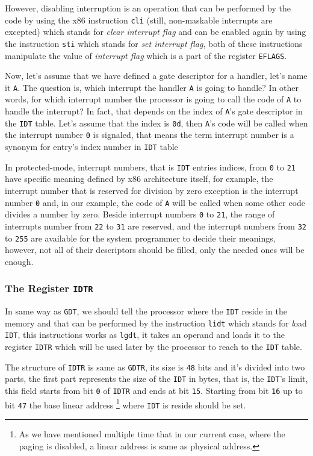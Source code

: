 However, disabling interruption is an operation that can be performed by
the code by using the x86 instruction \lstinline!cli! (still,
non-maskable interrupts are excepted) which stands for \emph{clear
interrupt flag} and can be enabled again by using the instruction
\lstinline!sti! which stands for \emph{set interrupt flag}, both of
these instructions manipulate the value of \emph{interrupt flag} which
is a part of the register \lstinline!EFLAGS!.

Now, let's assume that we have defined a gate descriptor for a handler,
let's name it \lstinline!A!. The question is, which interrupt the
handler \lstinline!A! is going to handle? In other words, for which
interrupt number the processor is going to call the code of
\lstinline!A! to handle the interrupt? In fact, that depends on the
index of \lstinline!A!'s gate descriptor in the \lstinline!IDT! table.
Let's assume that the index is \lstinline!0d!, then \lstinline!A!'s code
will be called when the interrupt number \lstinline!0! is signaled, that
means the term interrupt number is a synonym for entry's index number in
\lstinline!IDT! table

In protected-mode, interrupt numbers, that is \lstinline!IDT! entries
indices, from \lstinline!0! to \lstinline!21! have specific meaning
defined by x86 architecture itself, for example, the interrupt number
that is reserved for division by zero exception is the interrupt number
\lstinline!0! and, in our example, the code of \lstinline!A! will be
called when some other code divides a number by zero. Beside interrupt
numbers \lstinline!0! to \lstinline!21!, the range of interrupts number
from \lstinline!22! to \lstinline!31! are reserved, and the interrupt
numbers from \lstinline!32! to \lstinline!255! are available for the
system programmer to decide their meanings, however, not all of their
descriptors should be filled, only the needed ones will be enough.

\subsubsection{\texorpdfstring{The Register
\texttt{IDTR}}{The Register IDTR}}\label{the-register-idtr}

In same way as \lstinline!GDT!, we should tell the processor where the
\lstinline!IDT! reside in the memory and that can be performed by the
instruction \lstinline!lidt! which stands for \emph{l}oad
\lstinline!IDT!, this instructions works as \lstinline!lgdt!, it takes
an operand and loads it to the register \lstinline!IDTR! which will be
used later by the processor to reach to the \lstinline!IDT! table.

The structure of \lstinline!IDTR! is same as \lstinline!GDTR!, its size
is \lstinline!48! bits and it's divided into two parts, the first part
represents the size of the \lstinline!IDT! in bytes, that is, the
\lstinline!IDT!'s limit, this field starts from bit \lstinline!0! of
\lstinline!IDTR! and ends at bit \lstinline!15!. Starting from bit
\lstinline!16! up to bit \lstinline!47! the base linear address
\footnote{As we have mentioned multiple time that in our current case,
  where the paging is disabled, a linear address is same as physical
  address.} where \lstinline!IDT! is reside should be set.
